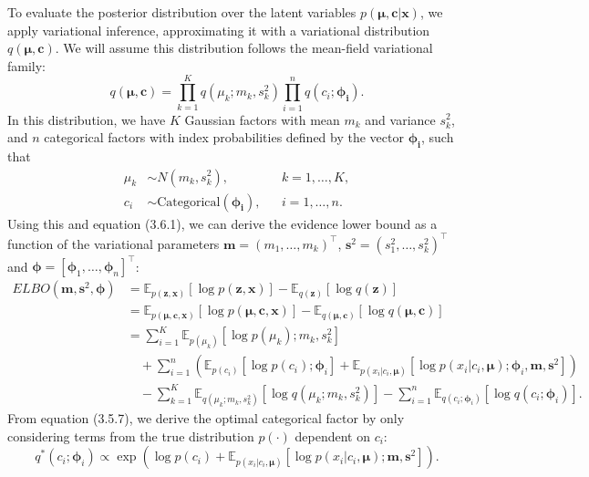 \documentclass[honours,12pt]{unswthesis}
\numberwithin{equation}{section}
\theoremstyle{definition}
\begin{document}
To evaluate the posterior distribution over the latent variables $p(\bm{\mu},\bm{c}|\bm{x})$, we apply variational inference, approximating it with a variational distribution $q(\bm{\mu},\bm{c})$. We will assume this distribution follows the mean-field variational family:
\[q(\bm{\mu},\bm{c})=\prod^K_{k=1}q(\mu_k;m_k,s^2_k)\prod^n_{i=1}q(c_i;\bm{\phi_i}).\]
\newpage
In this distribution, we have $K$ Gaussian factors with mean $m_k$ and variance $s^2_k$, and $n$ categorical factors with index probabilities defined by the vector $\bm{\phi_i}$, such that
\begin{align*}
\mu_k&\sim N(m_k,s^2_k), &&k=1,\dots,K,\\
c_i&\sim \text{Categorical}(\bm{\phi_i}), &&i=1,\dots,n.
\end{align*}
Using this and equation (3.6.1), we can derive the evidence lower bound as a function of the variational parameters $\bm{m}=(m_1,\dots,m_k)^\top$, $\bm{s}^2=(s_1^2,\dots,s_k^2)^\top$ and $\bm{\phi}=[\bm{\phi}_1,\dots,\bm{\phi}_n]^\top$:
\begin{align*}
ELBO(\bm{m},\bm{s}^2,\bm{\phi})&=\mathbb{E}_{p(\textbf{z},\bm{x})}[\log p(\textbf{z},\bm{x})]-\mathbb{E}_{q(\bm{z})}[\log q(\bm{z})]\\
&=\mathbb{E}_{p(\bm{\mu,c},\textbf{x})}[\log p(\bm{\mu,c},\textbf{x})]-\mathbb{E}_{q(\bm{\mu,c})}[\log q(\bm{\mu,c})]\\
&=\sum^K_{i=1}\mathbb{E}_{p(\mu_k)}[\log p(\mu_k); m_k,s^2_k]\\
&\quad +\sum^n_{i=1}\left(\mathbb{E}_{p(c_i)}[\log p(c_i);\bm{\phi}_i]+\mathbb{E}_{p(x_i|c_i,\bm{\mu})}[\log p(x_i|c_i,\bm{\mu});\bm{\phi}_i,\bm{m},\bm{s}^2]\right)\\
&\quad -\sum^K_{k=1}\mathbb{E}_{q(\mu_k;m_k,s^2_k)}[\log q(\mu_k;m_k,s^2_k)]-\sum^n_{i=1}\mathbb{E}_{q(c_i;\bm{\phi}_i)}[\log q(c_i;\bm{\phi}_i)].
\end{align*}
From equation (3.5.7), we derive the optimal categorical factor by only considering terms from the true distribution $p(\cdot)$ dependent on $c_i$:
\begin{equation}
q^*(c_i;\bm{\phi}_i)\propto \exp\left(\log p(c_i)+\mathbb{E}_{p(x_i|c_i,\bm{\mu})}[\log p(x_i|c_i,\bm{\mu});\bm{m},\bm{s}^2]\right).
\end{equation}
\end{document}
